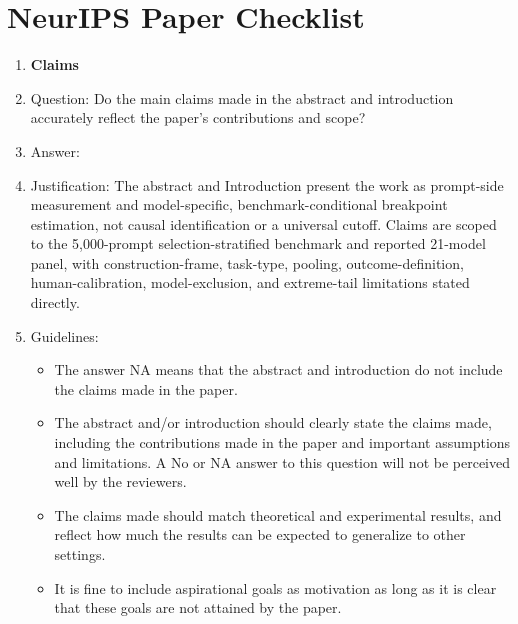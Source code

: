 \section*{NeurIPS Paper Checklist}

\begin{enumerate}

\item {\bf Claims}
    \item[] Question: Do the main claims made in the abstract and introduction accurately reflect the paper's contributions and scope?
    \item[] Answer: \answerYes{}
    \item[] Justification: The abstract and Introduction present the work as prompt-side measurement and model-specific, benchmark-conditional breakpoint estimation, not causal identification or a universal cutoff. Claims are scoped to the 5,000-prompt selection-stratified benchmark and reported 21-model panel, with construction-frame, task-type, pooling, outcome-definition, human-calibration, model-exclusion, and extreme-tail limitations stated directly.
    \item[] Guidelines:
    \begin{itemize}
        \item The answer NA means that the abstract and introduction do not include the claims made in the paper.
        \item The abstract and/or introduction should clearly state the claims made, including the contributions made in the paper and important assumptions and limitations. A No or NA answer to this question will not be perceived well by the reviewers.
        \item The claims made should match theoretical and experimental results, and reflect how much the results can be expected to generalize to other settings.
        \item It is fine to include aspirational goals as motivation as long as it is clear that these goals are not attained by the paper.
    \end{itemize}


\end{enumerate}
